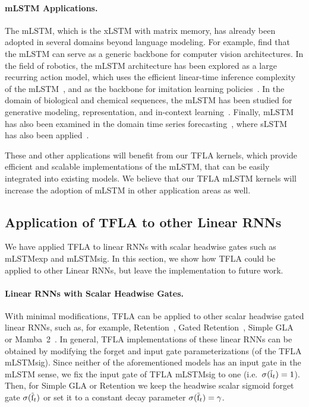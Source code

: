 \documentclass{article}
\begin{document}
    \paragraph{mLSTM Applications.}
    The mLSTM, which is the xLSTM with matrix memory, has already been adopted in several domains beyond language modeling.
    For example, \citet{alkin:25visionlstm} find that the mLSTM can serve as a generic backbone for computer vision architectures.
    In the field of robotics, the mLSTM architecture has been explored as a large recurring action model, which uses the efficient linear-time inference complexity of the mLSTM~\citep{schmied:25largerecurrentactionmodel}, and as the backbone for imitation learning policies~\citep{jia:25xilexploringdesignspace}.
    In the domain of biological and chemical sequences, the mLSTM has been studied for generative modeling, representation, and in-context learning~\citep{schmidinger:25bioxlstm}.
    Finally, mLSTM has also been examined in the domain time series forecasting~\citep{alharti:24xlstmtime}, where sLSTM~\citep{beck:24xlstm} has also been applied~\citep{ kraus:24xlstmmixermultivariatetimeseries,kong:25lstmlongtermtimeseries}.

    These and other applications will benefit from our TFLA kernels, which provide efficient and scalable implementations of the mLSTM, that can be easily integrated into existing models.
    We believe that our TFLA mLSTM kernels will increase the adoption of mLSTM in other application areas as well.

    \subsection{Application of TFLA to other Linear RNNs}
    \label{app:application_tfla_other_linear_rnns}

    We have applied TFLA to linear RNNs with scalar headwise gates such as mLSTMexp and mLSTMsig. 
    In this section, we show how TFLA could be applied to other Linear RNNs, but leave the implementation to future work.

    \paragraph{Linear RNNs with Scalar Headwise Gates.}
    With minimal modifications, TFLA can be applied to other scalar headwise gated linear RNNs, such as, for example, Retention~\citep{sun:23retentive}, Gated Retention~\citep{sun:24youonlycacheonce}, Simple GLA~\citep{yang:24gated} or Mamba~2~\citep{dao:24transformersaressms}.
    In general, TFLA implementations of these linear RNNs can be obtained by modifying the forget and input gate parameterizations (of the TFLA mLSTMsig). 
    Since neither of the aforementioned models has an input gate in the mLSTM sense, we fix the input gate of TFLA mLSTMsig to one (i.e.~$\sigma(\tilde{\mathrm{i}}_t) = 1$).
    Then, for Simple GLA or Retention we keep the headwise scalar sigmoid forget gate $\sigma(\tilde{\mathrm{f}}_t)$ or set it to a constant decay parameter $\sigma(\tilde{\mathrm{f}}_t) = \gamma$.
    
\end{document}
